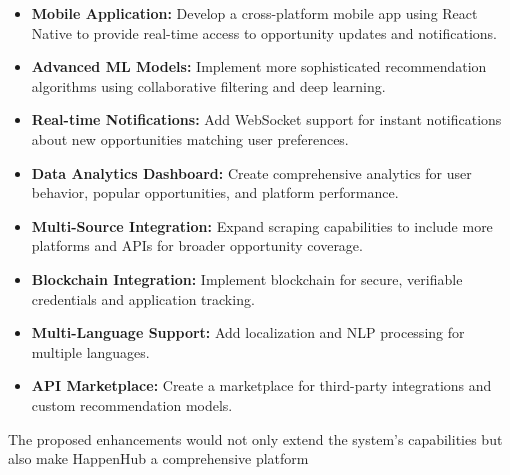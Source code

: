 \documentclass[12pt,a4paper]{report}
\begin{document}
\begin{itemize}
    \item \textbf{Mobile Application:} Develop a cross-platform mobile app using React Native to provide real-time access to opportunity updates and notifications.
    \item \textbf{Advanced ML Models:} Implement more sophisticated recommendation algorithms using collaborative filtering and deep learning.
    \item \textbf{Real-time Notifications:} Add WebSocket support for instant notifications about new opportunities matching user preferences.
    \item \textbf{Data Analytics Dashboard:} Create comprehensive analytics for user behavior, popular opportunities, and platform performance.
    \item \textbf{Multi-Source Integration:} Expand scraping capabilities to include more platforms and APIs for broader opportunity coverage.
    \item \textbf{Blockchain Integration:} Implement blockchain for secure, verifiable credentials and application tracking.
    \item \textbf{Multi-Language Support:} Add localization and NLP processing for multiple languages.
    \item \textbf{API Marketplace:} Create a marketplace for third-party integrations and custom recommendation models.
\end{itemize}

\noindent
The proposed enhancements would not only extend the system's capabilities but also make HappenHub a comprehensive platform


\renewcommand{\bibname}{References}
\end{document}
